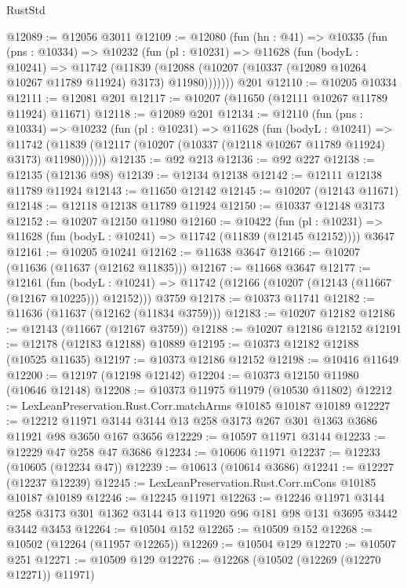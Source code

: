 \begin{lexlean}{RustStd}
\begin{coremodule}
@12089 := @12056 @3011
@12109 := @12080
    (fun (hn : @41) =>
    @10335
      (fun (pns : @10334) =>
      @10232
        (fun (pl : @10231) =>
        @11628
          (fun (bodyL : @10241) =>
          @11742
            (@11839
              (@12088 (@10207 (@10337 (@12089 @10264 @10267 @11789 @11924) @3173) @11980)))))))
    @201
@12110 := @10205 @10334
@12111 := @12081 @201
@12117 := @10207 (@11650 (@12111 @10267 @11789 @11924) @11671)
@12118 := @12089 @201
@12134 := @12110
    (fun (pns : @10334) =>
    @10232
      (fun (pl : @10231) =>
      @11628
        (fun (bodyL : @10241) =>
        @11742 (@11839 (@12117 (@10207 (@10337 (@12118 @10267 @11789 @11924) @3173) @11980))))))
@12135 := @92 @213
@12136 := @92 @227
@12138 := @12135 (@12136 @98)
@12139 := @12134 @12138
@12142 := @12111 @12138 @11789 @11924
@12143 := @11650 @12142
@12145 := @10207 (@12143 @11671)
@12148 := @12118 @12138 @11789 @11924
@12150 := @10337 @12148 @3173
@12152 := @10207 @12150 @11980
@12160 := @10422
    (fun (pl : @10231) => @11628 (fun (bodyL : @10241) => @11742 (@11839 (@12145 @12152))))
    @3647
@12161 := @10205 @10241
@12162 := @11638 @3647
@12166 := @10207 (@11636 (@11637 (@12162 @11835)))
@12167 := @11668 @3647
@12177 := @12161
    (fun (bodyL : @10241) => @11742 (@12166 (@10207 (@12143 (@11667 (@12167 @10225))) @12152)))
    @3759
@12178 := @10373 @11741
@12182 := @11636 (@11637 (@12162 (@11834 @3759)))
@12183 := @10207 @12182
@12186 := @12143 (@11667 (@12167 @3759))
@12188 := @10207 @12186 @12152
@12191 := @12178 (@12183 @12188) @10889
@12195 := @10373 @12182 @12188 (@10525 @11635)
@12197 := @10373 @12186 @12152
@12198 := @10416 @11649
@12200 := @12197 (@12198 @12142)
@12204 := @10373 @12150 @11980 (@10646 @12148)
@12208 := @10373 @11975 @11979 (@10530 @11802)
@12212 := LexLeanPreservation.Rust.Corr.matchArms @10185 @10187 @10189
@12227 := @12212 @11971 @3144 @3144 @13 @258 @3173 @267 @301 @1363 @3686 @11921 @98 @3650 @167 @3656
@12229 := @10597 @11971 @3144
@12233 := @12229 @47 @258 @47 @3686
@12234 := @10606 @11971
@12237 := @12233 (@10605 (@12234 @47))
@12239 := @10613 (@10614 @3686)
@12241 := @12227 (@12237 @12239)
@12245 := LexLeanPreservation.Rust.Corr.mCons @10185 @10187 @10189
@12246 := @12245 @11971
@12263 := @12246
    @11971
    @3144
    @258
    @3173
    @301
    @1362
    @3144
    @13
    @11920
    @96
    @181
    @98
    @131
    @3695
    @3442
    @3442
    @3453
@12264 := @10504 @152
@12265 := @10509 @152
@12268 := @10502 (@12264 (@11957 @12265))
@12269 := @10504 @129
@12270 := @10507 @251
@12271 := @10509 @129
@12276 := @12268 (@10502 (@12269 (@12270 @12271)) @11971)

\end{coremodule}
\end{lexlean}
